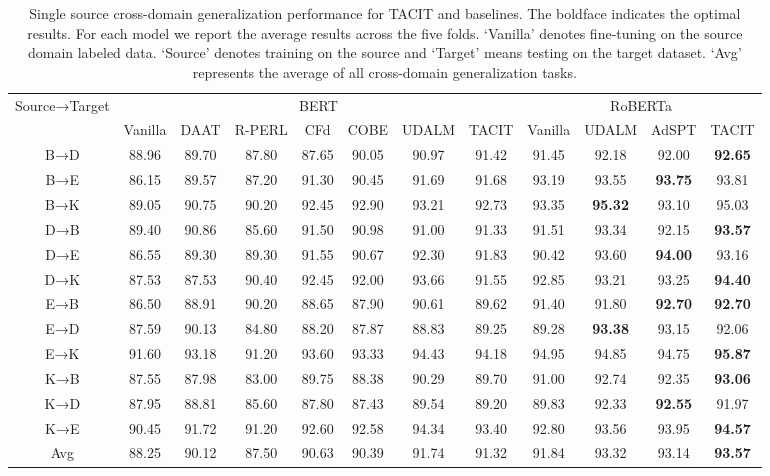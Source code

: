 \documentclass[letterpaper]{article} %
\begin{document}
\begin{table}[htbp]
	\centering
	\setlength\tabcolsep{1.6mm}
	\renewcommand{\arraystretch}{0.5}
	\begin{tabular}{cccccccc|cccc}
		\hline \hline
		\multirow{2}[0]{*}{Source→Target} & \multicolumn{7}{c}{BERT} & \multicolumn{4}{c}{RoBERTa} \\ \cline{2-12}
		& Vanilla & DAAT & R-PERL & CFd   & COBE  & UDALM & TACIT & Vanilla & UDALM & AdSPT & TACIT \\ \hline
		B→D & 88.96 & 89.70 & 87.80  & 87.65 & 90.05 & 90.97 & 91.42 & 91.45 & 92.18 & 92.00 & \textbf{92.65} \\
		B→E & 86.15 & 89.57 & 87.20  & 91.30 & 90.45 & 91.69 & 91.68 & 93.19 & 93.55 & \textbf{93.75} & 93.81 \\
		B→K & 89.05 & 90.75 & 90.20  & 92.45 & 92.90 & 93.21 & 92.73 & 93.35 & \textbf{95.32} & 93.10 & 95.03 \\
		D→B & 89.40 & 90.86 & 85.60  & 91.50 & 90.98 & 91.00 & 91.33 & 91.51 & 93.34 & 92.15 & \textbf{93.57} \\
		D→E & 86.55 & 89.30 & 89.30  & 91.55 & 90.67 & 92.30 & 91.83 & 90.42 & 93.60 & \textbf{94.00} & 93.16 \\
		D→K & 87.53 & 87.53 & 90.40  & 92.45 & 92.00 & 93.66 & 91.55 & 92.85 & 93.21 & 93.25 & \textbf{94.40} \\
		E→B & 86.50 & 88.91 & 90.20  & 88.65 & 87.90 & 90.61 & 89.62 & 91.40 & 91.80 & \textbf{92.70} & \textbf{92.70} \\
		E→D & 87.59 & 90.13 & 84.80  & 88.20 & 87.87 & 88.83 & 89.25 & 89.28 & \textbf{93.38} & 93.15 & 92.06 \\
		E→K & 91.60 & 93.18 & 91.20  & 93.60 & 93.33 & 94.43 & 94.18 & 94.95 & 94.85 & 94.75 & \textbf{95.87} \\
		K→B & 87.55 & 87.98 & 83.00  & 89.75 & 88.38 & 90.29 & 89.70 & 91.00 & 92.74 & 92.35 & \textbf{93.06} \\
		K→D & 87.95 & 88.81 & 85.60  & 87.80 & 87.43 & 89.54 & 89.20 & 89.83 & 92.33 & \textbf{92.55} & 91.97 \\
		K→E & 90.45 & 91.72 & 91.20  & 92.60 & 92.58 & 94.34 & 93.40 & 92.80 & 93.56 & 93.95 & \textbf{94.57} \\ \hline
		Avg & 88.25 & 90.12 & 87.50  & 90.63 & 90.39 & 91.74 & 91.32 & 91.84 & 93.32 & 93.14 & \textbf{93.57} \\ \hline \hline
	\end{tabular}%
	\caption{Single source cross-domain generalization performance for TACIT and baselines. The boldface indicates the optimal results. For each model we report the average results across the five folds. `Vanilla' denotes fine-tuning on the source domain labeled data. `Source' denotes training on the source and `Target' means testing on the target dataset. `Avg' represents the average of all cross-domain generalization tasks.}
	\label{tab:results}%
\end{table}%
\end{document}
